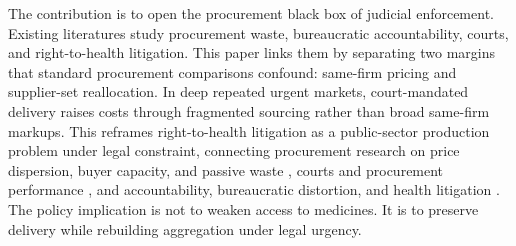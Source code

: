 The contribution is to open the procurement black box of judicial
enforcement. Existing literatures study procurement waste,
bureaucratic accountability, courts, and right-to-health litigation.
This paper links them by separating two margins that standard
procurement comparisons confound: same-firm pricing and supplier-set
reallocation. In deep repeated urgent markets, court-mandated delivery
raises costs through fragmented sourcing rather than broad same-firm
markups. This reframes right-to-health litigation as a public-sector
production problem under legal constraint, connecting procurement
research on price dispersion, buyer capacity, and passive waste
\citep{bandiera2009active,best2023procurement,bosio2022public,
decarolis2018buyer}, courts and procurement performance
\citep{coviello2018court}, and accountability, bureaucratic
distortion, and health litigation
\citep{prendergast2007bureaucrats,bandiera2021allocation,
ferraz2009right,wang2015right,biehl2009will}. The policy implication
is not to weaken access to medicines. It is to preserve delivery while
rebuilding aggregation under legal urgency.
